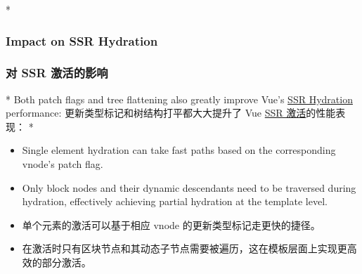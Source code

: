 \begin{paracol}{2} 
 
\switchcolumn[0]*%
\subsubsection{Impact on SSR Hydration}
\switchcolumn
\subsubsection{对 SSR 激活的影响}
\switchcolumn[0]*%
Both patch flags and tree flattening also greatly improve Vue's
\href{https://vuejs.org/guide/scaling-up/ssr.html\#client-hydration}{SSR
Hydration} performance:
\switchcolumn
更新类型标记和树结构打平都大大提升了 Vue
\href{https://cn.vuejs.org/guide/scaling-up/ssr.html\#client-hydration}{SSR
激活}的性能表现：
\switchcolumn[0]*%
\begin{itemize}
\item
  Single element hydration can take fast paths based on the
  corresponding vnode's patch flag.
\item
  Only block nodes and their dynamic descendants need to be traversed
  during hydration, effectively achieving partial hydration at the
  template level.
\end{itemize}
\switchcolumn
\begin{itemize}
\item
  单个元素的激活可以基于相应 vnode 的更新类型标记走更快的捷径。
\item
  在激活时只有区块节点和其动态子节点需要被遍历，这在模板层面上实现更高效的部分激活。
\end{itemize}
\end{paracol}

